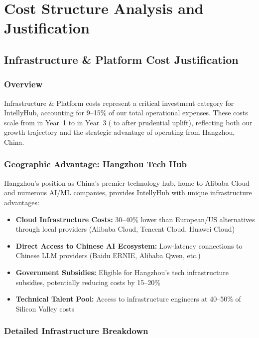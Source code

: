 
\restoregeometry
\endgroup

\section{Cost Structure Analysis and Justification}
\label{sec:cost-analysis}

\subsection{Infrastructure \& Platform Cost Justification}

\subsubsection{Overview}
Infrastructure \& Platform costs represent a critical investment category for IntellyHub, accounting for 9--15\% of our total operational expenses. These costs scale from  in Year~1 to  in Year~3 ( to  after prudential uplift), reflecting both our growth trajectory and the strategic advantage of operating from Hangzhou, China.

\subsubsection{Geographic Advantage: Hangzhou Tech Hub}
Hangzhou's position as China's premier technology hub, home to Alibaba Cloud and numerous AI/ML companies, provides IntellyHub with unique infrastructure advantages:

\begin{itemize}
    \item \textbf{Cloud Infrastructure Costs:} 30--40\% lower than European/US alternatives through local providers (Alibaba Cloud, Tencent Cloud, Huawei Cloud)
    \item \textbf{Direct Access to Chinese AI Ecosystem:} Low-latency connections to Chinese LLM providers (Baidu ERNIE, Alibaba Qwen, etc.)
    \item \textbf{Government Subsidies:} Eligible for Hangzhou's tech infrastructure subsidies, potentially reducing costs by 15--20\%
    \item \textbf{Technical Talent Pool:} Access to infrastructure engineers at 40--50\% of Silicon Valley costs
\end{itemize}

\subsubsection{Detailed Infrastructure Breakdown}

